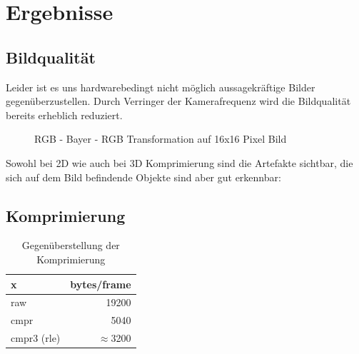 
\chapter{Ergebnisse}

\section{Bildqualität}
Leider ist es uns hardwarebedingt nicht m\"oglich aussagekr\"aftige Bilder 
gegen\"uberzustellen. Durch Verringer der Kamerafrequenz wird die Bildqualit\"at bereits erheblich reduziert. 

\begin{figure}[htpb]
\begin{center}
\end{center}
\caption{RGB - Bayer - RGB Transformation auf 16x16 Pixel Bild}
\label{fig:sample}
\end{figure}

Sowohl bei 2D wie auch bei 3D Komprimierung sind die Artefakte sichtbar,
die sich auf dem Bild befindende Objekte sind aber gut erkennbar:


\section{Komprimierung}
\begin{table}[hp]
\centering
\begin{tabular}{|l|r|}
\hline
      x     & bytes/frame   \\
\hline
raw         & 19200         \\
cmpr        &  5040         \\
cmpr3 (rle) & $\approx$3200 \\
\hline
\end{tabular}
\caption{Gegen\"uberstellung der Komprimierung}
\end{table}


